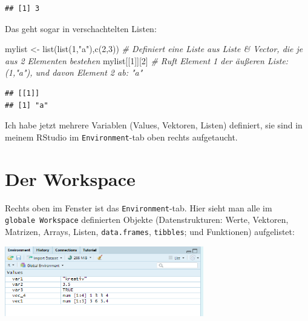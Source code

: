 \documentclass[
]{book}
\newenvironment{Shaded}{\begin{snugshade}}{\end{snugshade}}
\newcommand{\CommentTok}[1]{\textcolor[rgb]{0.56,0.35,0.01}{\textit{#1}}}
\newcommand{\DecValTok}[1]{\textcolor[rgb]{0.00,0.00,0.81}{#1}}
\newcommand{\FunctionTok}[1]{\textcolor[rgb]{0.00,0.00,0.00}{#1}}
\newcommand{\NormalTok}[1]{#1}
\newcommand{\OtherTok}[1]{\textcolor[rgb]{0.56,0.35,0.01}{#1}}
\newcommand{\StringTok}[1]{\textcolor[rgb]{0.31,0.60,0.02}{#1}}
\theoremstyle{definition}
\theoremstyle{definition}
\theoremstyle{definition}
\theoremstyle{definition}
\theoremstyle{remark}
\begin{document}
\begin{verbatim}
## [1] 3
\end{verbatim}

Das geht sogar in verschachtelten Listen:

\begin{Shaded}
\begin{Highlighting}[]
\NormalTok{mylist }\OtherTok{\textless{}{-}} \FunctionTok{list}\NormalTok{(}\FunctionTok{list}\NormalTok{(}\DecValTok{1}\NormalTok{,}\StringTok{"a"}\NormalTok{),}\FunctionTok{c}\NormalTok{(}\DecValTok{2}\NormalTok{,}\DecValTok{3}\NormalTok{)) }\CommentTok{\# Definiert eine Liste aus Liste \& Vector, die je aus 2 Elementen bestehen }
\NormalTok{mylist[[}\DecValTok{1}\NormalTok{]][}\DecValTok{2}\NormalTok{]                     }\CommentTok{\# Ruft Element 1 der äußeren Liste: (1,"a"), und davon Element 2 ab: "a"}
\end{Highlighting}
\end{Shaded}

\begin{verbatim}
## [[1]]
## [1] "a"
\end{verbatim}

Ich habe jetzt mehrere Variablen (Values, Vektoren, Listen) definiert, sie sind in meinem RStudio im \texttt{Environment}-tab oben rechts aufgetaucht.

\hypertarget{der-workspace}{%
\section{Der Workspace}\label{der-workspace}}

Rechts oben im Fenster ist das \texttt{Environment}-tab. Hier sieht man alle im \texttt{globale\ Workspace} definierten Objekte (Datenstrukturen: Werte, Vektoren, Matrizen, Arrays, Listen, \texttt{data.frames}, \texttt{tibbles}; und Funktionen) aufgelistet:

\includegraphics[width=0.65\textwidth,height=\textheight]{_bookdown_files/_main_files/figure-html/Workspace.png}
\end{document}
